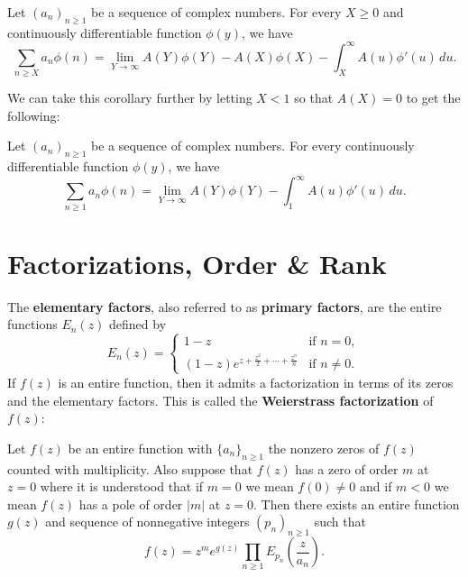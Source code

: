     \begin{corollary}\label{cor:Abels_summation_formula_limit_version}
      Let $(a_{n})_{n \ge 1}$ be a sequence of complex numbers. For every $X \ge 0$ and continuously differentiable function $\phi(y)$, we have
      \[
        \sum_{n \ge X}a_{n}\phi(n) = \lim_{Y \to \infty}A(Y)\phi(Y)-A(X)\phi(X)-\int_{X}^{\infty}A(u)\phi'(u)\,du.
      \]
    \end{corollary}

    We can take this corollary further by letting $X < 1$ so that $A(X) = 0$ to get the following:

    \begin{corollary}\label{cor:Abels_summation_formula_limit_version_specialization}
      Let $(a_{n})_{n \ge 1}$ be a sequence of complex numbers. For every continuously differentiable function $\phi(y)$, we have
      \[
        \sum_{n \ge 1}a_{n}\phi(n) = \lim_{Y \to \infty}A(Y)\phi(Y)-\int_{1}^{\infty}A(u)\phi'(u)\,du.
      \]
    \end{corollary}
  \section{Factorizations, Order \& Rank}\label{append:Factorizations_and_Finite_Order}
    The \textbf{elementary factors}, also referred to as \textbf{primary factors}, are the entire functions $E_{n}(z)$ defined by
    \[
      E_{n}(z) = \begin{cases} 1-z & \text{if } n = 0, \\ (1-z)e^{z+\frac{z^{2}}{2}+\cdots+\frac{z^{n}}{n}} & \text{if } n \neq 0. \end{cases}
    \]
    If $f(z)$ is an entire function, then it admits a factorization in terms of its zeros and the elementary factors. This is called the \textbf{Weierstrass factorization} of $f(z)$:

    \begin{theorem}
      Let $f(z)$ be an entire function with $\{a_{n}\}_{n \ge 1}$ the nonzero zeros of $f(z)$ counted with multiplicity. Also suppose that $f(z)$ has a zero of order $m$ at $z = 0$ where it is understood that if $m = 0$ we mean $f(0) \neq 0$ and if $m < 0$ we mean $f(z)$ has a pole of order $|m|$ at $z = 0$. Then there exists an entire function $g(z)$ and sequence of nonnegative integers $(p_{n})_{n \ge 1}$ such that
      \[
        f(z) = z^{m}e^{g(z)}\prod_{n \ge 1}E_{p_{n}}\left(\frac{z}{a_{n}}\right).
      \]
    \end{theorem}

